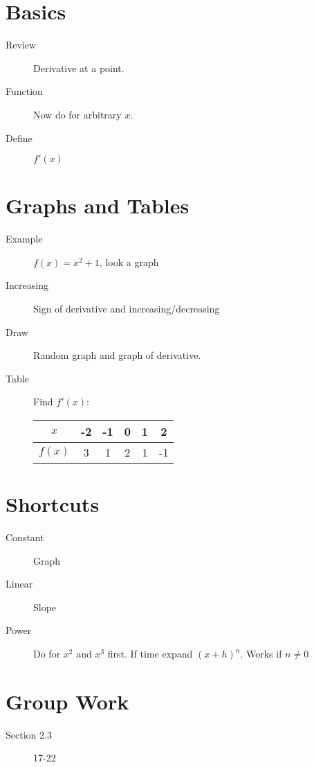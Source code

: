 \documentclass[11pt]{article}
\begin{document}
\drawtitle

\section*{Basics}
\begin{description}
\item[Review] Derivative at a point.
\item[Function] Now do for arbitrary $x$.
\item[Define] $f'(x)$
\end{description}

\section*{Graphs and Tables}
\begin{description}
\item[Example] $f(x)=x^2+1$, look a graph
\item[Increasing] Sign of derivative and increasing/decreasing
\item[Draw] Random graph and graph of derivative.
\item[Table] Find $f'(x)$:
  \begin{center}
    \begin{tabular}{|c|c|c|c|c|c|}
\hline
$x$    & -2 & -1 & 0 & 1 &  2\\
\hline
$f(x)$ &  3 &  1 & 2 & 1 & -1\\
\hline
    \end{tabular}
  \end{center}
\end{description}

\section*{Shortcuts}
\begin{description}
\item[Constant] Graph
\item[Linear] Slope
\item[Power] Do for $x^2$ and $x^3$ first.  If time expand $(x+h)^n$.
  Works if $n\neq 0$
\end{description}

\section*{Group Work}
\begin{description}
\item[Section 2.3] 17-22
\end{description}
\end{document}
